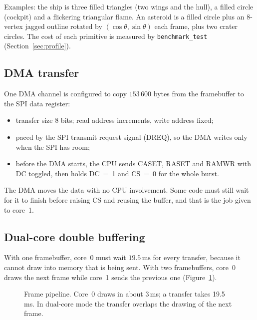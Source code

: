 \documentclass[11pt,a4paper]{article}
\newcommand{\unit}[2]{\ensuremath{#1\,\mathrm{#2}}}
\begin{document}
\noindent Examples: the ship is three filled triangles (two wings and the hull),
a filled circle (cockpit) and a flickering triangular flame. An asteroid is a
filled circle plus an 8-vertex jagged outline rotated by $(\cos\theta,
\sin\theta)$ each frame, plus two crater circles. The cost of each primitive is
measured by \texttt{benchmark\_test} (Section~\ref{sec:profile}).

\subsection{DMA transfer}
One DMA channel is configured to copy $153\,600$ bytes from the framebuffer to
the SPI data register:
\begin{itemize}
  \item transfer size 8 bits; read address increments, write address fixed;
  \item paced by the SPI transmit request signal (DREQ), so the DMA writes only
        when the SPI has room;
  \item before the DMA starts, the CPU sends CASET, RASET and RAMWR with DC
        toggled, then holds DC~=~1 and CS~=~0 for the whole burst.
\end{itemize}
The DMA moves the data with no CPU involvement. Some code must still wait for
it to finish before raising CS and reusing the buffer, and that is the job
given to core~1.

\subsection{Dual-core double buffering}\label{sec:dualcore}
With one framebuffer, core~0 must wait \unit{19.5}{ms} for every transfer,
because it cannot draw into memory that is being sent. With two framebuffers,
core~0 draws the next frame while core~1 sends the previous one
(Figure~\ref{fig:pipeline}).

\begin{figure}[H]
\centering
{}
\caption{Frame pipeline. Core~0 draws in about 3\,ms; a transfer takes 19.5\,ms.
In dual-core mode the transfer overlaps the drawing of the next frame.}\label{fig:pipeline}
\end{figure}
\end{document}

